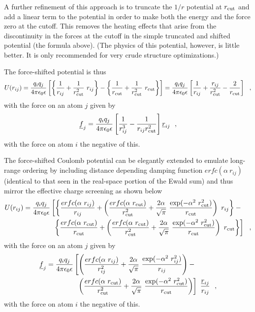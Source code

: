 A further refinement of this approach is to truncate the $1/r$
potential at $r_{\rm cut}$ and add a linear term to the potential
in order to make both the energy and the force zero at the cutoff.
This removes the heating effects that arise from the discontinuity
in the forces at the cutoff in the simple truncated and shifted
potential (the formula above).  (The physics of this potential,
however, is little better.  It is only recommended for very crude
structure optimizations.)

The force-shifted potential is thus
\begin{equation}
U(r_{ij}) = {q_{i} q_{j} \over 4\pi\epsilon_{0}\epsilon}
\left[ \left\{\frac{1}{r_{ij}}+\frac{1}{r_{\rm cut}^{2}}~r_{ij}\right\} -
\left\{\frac{1}{r_{\rm cut}}+\frac{1}{r_{\rm cut}^{2}}~r_{\rm cut}\right\} \right]
= {q_{i} q_{j} \over 4\pi\epsilon_{0}\epsilon}
\left[ \frac{1}{r_{ij}} + \frac{r_{ij}}{r_{\rm cut}^{2}} - \frac{2}{r_{\rm cut}} \right]~~,
\end{equation}
with the force on an atom $j$ given by
\begin{equation}
\mbox{$\underline{f}$}_{j} = \frac{q_{i}q_{j}}{4\pi\epsilon_{0}\epsilon}
\left[ \frac{1} {r_{ij}^{3}} - \frac{1}{r_{ij}r_{\rm cut}^{2}} \right] \mbox{$\underline{r}$}_{ij}~~,
\end{equation}
with the force on atom $i$ the negative of this.

The force-shifted Coulomb potential can be elegantly extended to
emulate long-range ordering by including distance depending damping
function $erfc(\alpha~r_{ij})$ (identical to that seen in the
real-space portion of the Ewald sum) and thus mirror the effective
charge screening \cite{fennell-06} as shown below
\begin{eqnarray}
U(r_{ij}) = {q_{i} q_{j} \over 4\pi\epsilon_{0}\epsilon} \left[
\left\{ \frac{erfc(\alpha~r_{ij})}{r_{ij}} + \left(\frac{erfc(\alpha~r_{\rm cut})}{r_{\rm cut}^{2}}+
\frac{2\alpha}{\sqrt{\pi}}~\frac{\exp(-\alpha^{2}~r_{\rm cut}^{2})}{r_{\rm cut}}\right)~r_{ij}\right\} - \phantom{xx} \right. \nonumber \\
\left. \left\{ \frac{erfc(\alpha~r_{\rm cut})}{r_{\rm cut}} + \left(\frac{erfc(\alpha~r_{\rm cut})}{r_{\rm cut}^{2}}+
\frac{2\alpha}{\sqrt{\pi}}~\frac{\exp(-\alpha^{2}~r_{\rm cut}^{2})}{r_{\rm cut}}\right)~r_{\rm cut}\right\} \right]~~,
\end{eqnarray}
with the force on an atom $j$ given by
\begin{eqnarray}
\mbox{$\underline{f}$}_{j} = {q_{i} q_{j} \over 4\pi\epsilon_{0}\epsilon} \left[ \left( \frac{erfc(\alpha~r_{ij})}{r_{ij}^{2}} +
\frac{2\alpha}{\sqrt{\pi}}~\frac{\exp(-\alpha^{2}~r_{ij}^{2})}{r_{ij}} \right) - \phantom{xxxxx} \right. \nonumber \\
\left. \left( \frac{erfc(\alpha~r_{\rm cut})}{r_{\rm cut}^{2}} +
\frac{2\alpha}{\sqrt{\pi}}~\frac{\exp(-\alpha^{2}~r_{\rm cut}^{2})}{r_{\rm cut}} \right) \right]~\frac{\mbox{$\underline{r}$}_{ij}}{r_{ij}}~~,
\end{eqnarray}
with the force on atom $i$ the negative of this.

